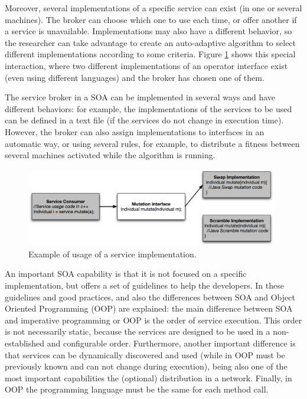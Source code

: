 Moreover, several implementations of a specific service  can exist (in one or several machines). The broker can choose which one to use  each time, or offer another if a service is unavailable. Implementations  may also have a different behavior, so the researcher can take advantage to create an auto-adaptive algorithm to select different implementations according to some criteria. Figure \ref{fig:servicebasic} shows this special interaction, where two different implementations of an operator interface exist (even using different languages) and the broker has chosen one of them.


The service broker in a SOA can be implemented in several ways and have
different behaviors: for example, the implementations of the services to be used can be
defined in a text file (if the services do not change in execution
time). However, the broker can also assign implementations to
interfaces in an automatic way, or using several rules, for example,
to distribute a fitness between several machines activated while the
algorithm is running. 


\begin{figure}
\centering
\includegraphics[width=26pc]{gfx/soa/exampleSOA.jpg}
\caption{Example of usage of a service implementation.}
\label{fig:servicebasic}
\end{figure}




An important SOA capability is that it is not focused on a specific
implementation, but offers a set of guidelines to help the
developers. In \citep{Arsanjani2008SOMA} these guidelines and good practices, and also the differences between SOA and Object Oriented
Programming (OOP) are
explained: the main difference between SOA and imperative programming or OOP is the order of service execution. This order is not necessarily static, because the services are designed to be used in a non-established and configurable order. Furthermore, another important difference is that services can be dynamically discovered and used (while in OOP must be previously known and can not change during execution), being also one of the most important capabilities the (optional) distribution in a network. Finally, in OOP the programming language must be the same for each method call.

